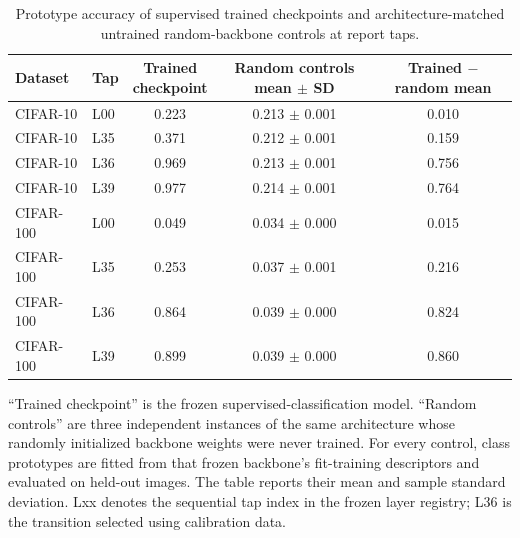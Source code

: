 \begin{table}[!htbp]
\centering
\begin{threeparttable}
\caption{Prototype accuracy of supervised trained checkpoints and
architecture-matched untrained random-backbone controls at report taps.}
\label{tab:pca-trained-random-main}
\small
\setlength{\tabcolsep}{4.5pt}
\renewcommand{\arraystretch}{1.08}
\begin{tabularx}{\linewidth}{@{}l l c c c@{}}
\toprule
Dataset & Tap & \makecell{Trained\\checkpoint} &
\makecell{Random controls\\mean $\pm$ SD} &
\makecell{Trained $-$\\random mean}\\
\midrule
CIFAR-10 & L00 & 0.223 & 0.213 $\pm$ 0.001 & 0.010\\
\thinrowrule
CIFAR-10 & L35 & 0.371 & 0.212 $\pm$ 0.001 & 0.159\\
\thinrowrule
\rowcolor{transitionrow} CIFAR-10 & L36 & 0.969 & 0.213 $\pm$ 0.001 & 0.756\\
\thinrowrule
CIFAR-10 & L39 & 0.977 & 0.214 $\pm$ 0.001 & 0.764\\
\midrule
CIFAR-100 & L00 & 0.049 & 0.034 $\pm$ 0.000 & 0.015\\
\thinrowrule
CIFAR-100 & L35 & 0.253 & 0.037 $\pm$ 0.001 & 0.216\\
\thinrowrule
\rowcolor{transitionrow} CIFAR-100 & L36 & 0.864 & 0.039 $\pm$ 0.000 & 0.824\\
\thinrowrule
CIFAR-100 & L39 & 0.899 & 0.039 $\pm$ 0.000 & 0.860\\
\bottomrule
\end{tabularx}
\begin{tablenotes}[flushleft]\footnotesize
\item ``Trained checkpoint'' is the frozen supervised-classification model.
``Random controls'' are three independent instances of the same architecture
whose randomly initialized backbone weights were never trained. For every
control, class prototypes are fitted from that frozen backbone's fit-training
descriptors and evaluated on held-out images. The table reports their mean and
sample standard deviation. Lxx denotes the sequential tap index in the frozen
layer registry; L36 is the transition selected using calibration data.
\end{tablenotes}
\end{threeparttable}
\end{table}
